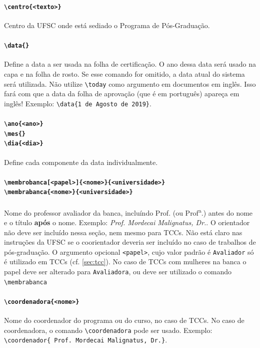 \documentclass[embeddedlogo]{../ufsc-thesis-rn46-2019}
\newcommand{\lacmd}[1]{\texttt{\textbackslash{}#1}}
\begin{document}
\paragraph*{\lacmd{centro\{<texto>\}}} Centro da UFSC onde está sediado o
Programa de Pós-Graduação.

\paragraph*{\lacmd{data\{<data por extenso>\}}} Define a data a ser usada na
folha de certificação. O ano dessa data será usado na capa e na folha de
rosto. Se esse comando for omitido, a data atual do sistema será utilizada. Não
utilize \lacmd{today} como argumento em documentos em inglês. Isso fará com que
a data da folha de aprovação (que é em português) apareça em inglês! Exemplo:
\lacmd{data\{1 de Agosto de 2019\}}.

\paragraph*{\lacmd{ano\{<ano>\}} \\
            \lacmd{mes\{<nome do mes>\}} \\
            \lacmd{dia\{<dia>\}}}
Define cada componente da data individualmente.

\paragraph*{\lacmd{membrobanca[<papel>]\{<nome>\}\{<universidade>\}} \\
            \lacmd{membrabanca\{<nome>\}\{<universidade>\}}}
Nome do professor avaliador da banca, incluíndo Prof. (ou
Prof\textsuperscript{a}.) antes do nome e o título \textbf{após} o
nome. Exemplo: \emph{Prof. Mordecai Malignatus, Dr.}. O orientador não deve ser
incluído nessa seção, nem mesmo para TCCs. Não está claro nas instruções da UFSC
se o coorientador deveria ser incluído no caso de trabalhos de pós-graduação. O
argumento opcional \texttt{<papel>}, cujo valor padrão é \texttt{Avaliador} só é
utilizado em TCCs (cf. \autoref{sec:tcc}). No caso de TCCs com mulheres na banca
o papel deve ser alterado para \texttt{Avaliadora}, ou deve ser utilizado o
comando \lacmd{membrabanca}

\paragraph*{\lacmd{coordenadora\{<nome>\}}} Nome do coordenador do programa ou
do curso, no caso de TCCs. No caso de coordenadora, o comando
\lacmd{coordenadora} pode ser usado. Exemplo: \lacmd{coordenador\{
  Prof. Mordecai Malignatus, Dr.\}}.
\end{document}
